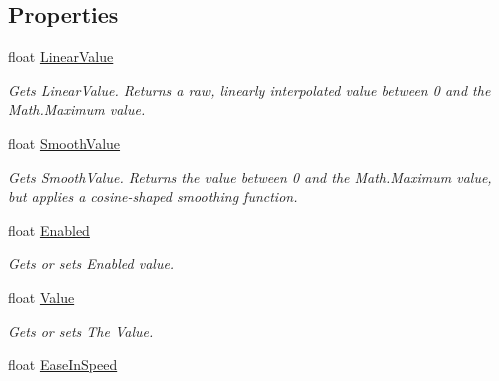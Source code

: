 \subsection*{Properties}
\begin{DoxyCompactItemize}
\item 
float \hyperlink{class_microsoft_1_1_samples_1_1_kinect_1_1_avateering_1_1_filters_1_1_timed_lerp_a3b40018bedff53d1fcbb9846819546a9}{Linear\+Value}
\begin{DoxyCompactList}\small\item\em Gets Linear\+Value. Returns a raw, linearly interpolated value between 0 and the Math.\+Maximum value. \end{DoxyCompactList}\item 
float \hyperlink{class_microsoft_1_1_samples_1_1_kinect_1_1_avateering_1_1_filters_1_1_timed_lerp_a6dcdd78c7c307469b295ae76b5b41eda}{Smooth\+Value}
\begin{DoxyCompactList}\small\item\em Gets Smooth\+Value. Returns the value between 0 and the Math.\+Maximum value, but applies a cosine-\/shaped smoothing function. \end{DoxyCompactList}\item 
float \hyperlink{class_microsoft_1_1_samples_1_1_kinect_1_1_avateering_1_1_filters_1_1_timed_lerp_ab64a8022d62f23eae5f19239dd734b1a}{Enabled}
\begin{DoxyCompactList}\small\item\em Gets or sets Enabled value. \end{DoxyCompactList}\item 
float \hyperlink{class_microsoft_1_1_samples_1_1_kinect_1_1_avateering_1_1_filters_1_1_timed_lerp_a5f0d73e5e719721431fe9aa90b863788}{Value}
\begin{DoxyCompactList}\small\item\em Gets or sets The Value. \end{DoxyCompactList}\item 
float \hyperlink{class_microsoft_1_1_samples_1_1_kinect_1_1_avateering_1_1_filters_1_1_timed_lerp_ae01477cadfec29642886ebc8f61c9a1c}{Ease\+In\+Speed}

\end{DoxyCompactItemize}
